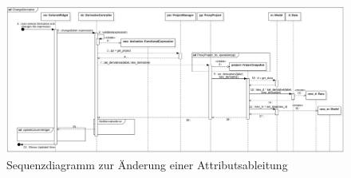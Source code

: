 \documentclass{article}
\begin{document}
\begin{figure}[H]%
    \centering
    \includegraphics[width=12cm]{entwurf/Floriane/ChangeDerivative.png}
    \caption{Sequenzdiagramm zur Änderung einer Attributsableitung}
    \label{fig:sd:ChangeDerivativeSequenceDiagram}
\end{figure}
\end{document}
